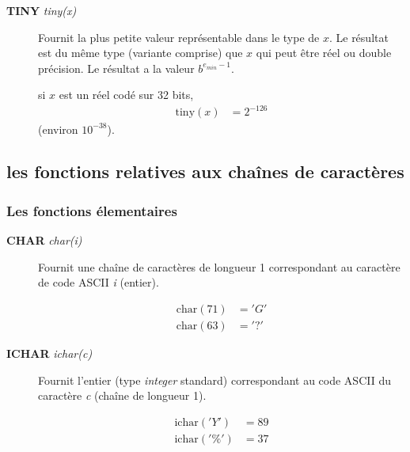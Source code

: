 \documentclass[a4paper,twoside]{article}
\begin{document}
\begin{description}
\item[\textbf{TINY} \emph{tiny(x)}] Fournit la plus petite valeur représentable dans le type de $x$. Le résultat est du même type (variante comprise) que $x$ qui peut être réel ou double précision. Le résultat a la valeur $b^{e_{min}-1}$. 
\begin{exemple}
si $x$ est un réel codé sur 32 bits, 
\begin{align}
\mathrm{tiny}(x)  &= 2^{-126}
\end{align}
(environ $10^{-38}$).
\end{exemple}
    
\end{description}

\subsection{les fonctions relatives aux chaînes de caractères}

\subsubsection{Les fonctions élementaires}

\begin{description}

\item[\textbf{CHAR} \emph{char(i)}] Fournit une chaîne de caractères de longueur 1 correspondant au caractère de code ASCII \emph{i} (entier). 
\begin{exemple}
\begin{align}
\mathrm{char}(71)  &= 'G'\\
\mathrm{char}(63)  &= '?'
\end{align}

\end{exemple}

\item[\textbf{ICHAR} \emph{ichar(c)}] Fournit l'entier (type \emph{integer} standard) correspondant au code ASCII du caractère \emph{c}  (chaîne de longueur 1). 
\begin{exemple}
\begin{align}
\mathrm{ichar}('Y')  &= 89\\
\mathrm{ichar}('\%')  &= 37
\end{align}

\end{exemple}

\end{description}
\end{document}
